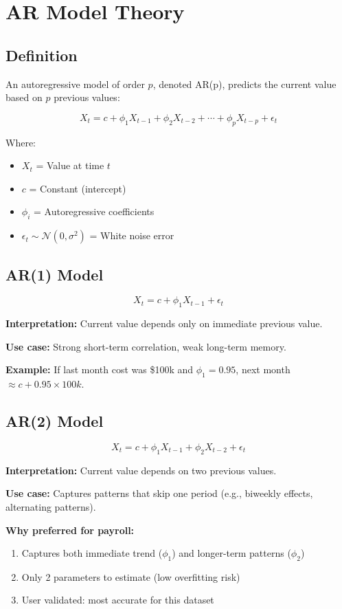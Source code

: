 \section{AR Model Theory}

\subsection{Definition}

An autoregressive model of order $p$, denoted AR(p), predicts the current value based on $p$ previous values:

$$X_t = c + \phi_1 X_{t-1} + \phi_2 X_{t-2} + \cdots + \phi_p X_{t-p} + \epsilon_t$$

Where:
\begin{itemize}
    \item $X_t$ = Value at time $t$
    \item $c$ = Constant (intercept)
    \item $\phi_i$ = Autoregressive coefficients
    \item $\epsilon_t \sim \mathcal{N}(0, \sigma^2)$ = White noise error
\end{itemize}

\subsection{AR(1) Model}

$$X_t = c + \phi_1 X_{t-1} + \epsilon_t$$

\textbf{Interpretation:} Current value depends only on immediate previous value.

\textbf{Use case:} Strong short-term correlation, weak long-term memory.

\textbf{Example:} If last month cost was \$100k and $\phi_1 = 0.95$, next month $\approx c + 0.95 \times 100k$.

\subsection{AR(2) Model}

$$X_t = c + \phi_1 X_{t-1} + \phi_2 X_{t-2} + \epsilon_t$$

\textbf{Interpretation:} Current value depends on two previous values.

\textbf{Use case:} Captures patterns that skip one period (e.g., biweekly effects, alternating patterns).

\textbf{Why preferred for payroll:}
\begin{enumerate}
    \item Captures both immediate trend ($\phi_1$) and longer-term patterns ($\phi_2$)
    \item Only 2 parameters to estimate (low overfitting risk)
    \item User validated: most accurate for this dataset
\end{enumerate}

